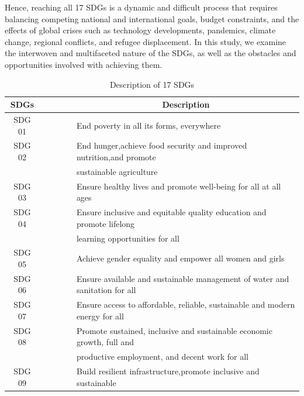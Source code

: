 \documentclass[10pt]{mcmthesis}
\begin{document}
Hence, reaching all 17 SDGs is a dynamic and difficult process that requires balancing competing national and international goals, budget constraints, and the effects of global crises such as technology developments, pandemics, climate change, regional conflicts, and refugee displacement\cite{shulla2021effects}. 
In this study, we examine the interwoven and multifaceted nature of the SDGs, as well as the obstacles and opportunities involved with achieving them. 
\begin{table}[h]\caption{Description of 17 SDGs}
\centering
\footnotesize
\begin{tabular}{clllll}
\hline
SDGs   &  &  &  &  & \multicolumn{1}{c}{Description}                                                                 \\ \hline
SDG 01 &  &  &  &  & End poverty in all its forms, everywhere                                     \\
SDG 02 &  &  &  &  & End hunger,achieve food security and improved nutrition,and promote          \\
       &  &  &  &  & sustainable agriculture                                                      \\
SDG 03 &  &  &  &  & Ensure healthy lives and promote well-being for all at all ages              \\
SDG 04 &  &  &  &  & Ensure inclusive and equitable quality education and promote lifelong        \\
       &  &  &  &  & learning opportunities for all                                               \\
SDG 05 &  &  &  &  & Achieve gender equality and empower all women and girls                      \\
SDG 06 &  &  &  &  & Ensure available and sustainable management of water and sanitation for all  \\
SDG 07 &  &  &  &  & Ensure access to affordable, reliable, sustainable and modern energy for all \\
SDG 08 &  &  &  &  & Promote sustained, inclusive and sustainable economic growth, full and         \\
       &  &  &  &  & productive employment, and decent work for all                                \\
SDG 09 &  &  &  &  & Build resilient infrastructure,promote inclusive and sustainable             \\

\end{tabular}
\end{table}
\end{document}
